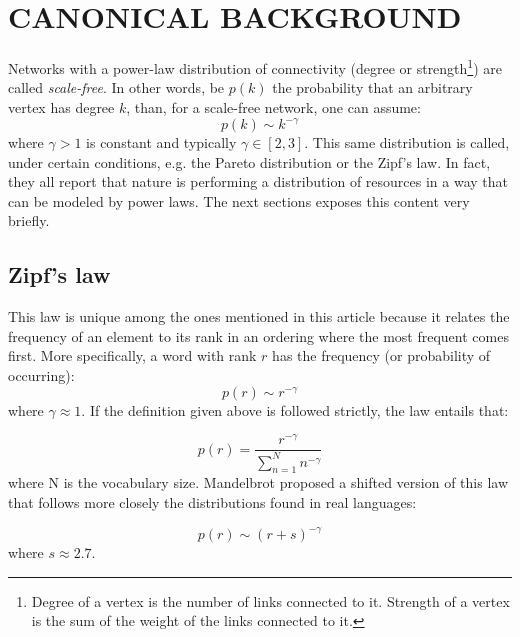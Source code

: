 \documentclass[12pt,fleqn]{article}
\begin{document}
\section{CANONICAL BACKGROUND}\label{sec:can}
Networks with a power-law distribution of connectivity (degree or strength\footnote{Degree of a vertex
is the number of links connected to it.
Strength of a vertex is the sum of the weight of the links connected to it.})
are called \emph{scale-free}.
In other words, be $p(k)$ the probability that an arbitrary vertex has degree $k$,
than, for a scale-free network, one can assume:
\begin{equation}
p(k) \sim k^{-\gamma}
\end{equation}
\noindent where $\gamma > 1$ is constant and typically $\gamma \in [2,3]$.
This same distribution is called, under certain conditions, e.g. the Pareto distribution or the Zipf's law.
In fact, they all report that nature is performing a distribution of resources in
a way that can be modeled by power laws.
The next sections exposes this content very briefly.


\subsection{Zipf's law}
This law is unique among the ones mentioned in this article because it
relates the frequency of an element to its rank in an ordering where the
most frequent comes first.
More specifically, a word with rank $r$ has the frequency (or probability of occurring):
\begin{equation}\label{eq:pl}
p(r) \sim r^{-\gamma}
\end{equation}
\noindent where $\gamma \approx 1$.
If the definition given above is followed strictly, the law entails
that:

\begin{equation}
	p(r) = \frac{r^{-\gamma}}{\sum_{n=1}^N n^{-\gamma}}
\end{equation}
\noindent where N is the vocabulary size.
Mandelbrot proposed a shifted version of this law that
follows more closely the distributions found in real languages:

\begin{equation}
	p(r) \sim (r+s)^{-\gamma}
\end{equation}
\noindent where $s\approx 2.7$.
\end{document}
